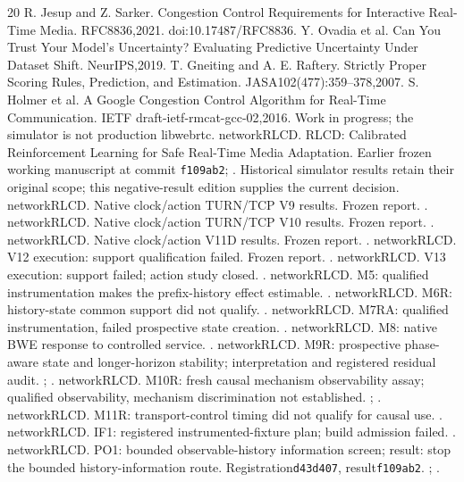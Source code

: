 \begin{thebibliography}{20}
 R. Jesup and Z. Sarker. Congestion Control Requirements for
Interactive Real-Time Media. RFC8836,2021. doi:10.17487/RFC8836.
 Y. Ovadia et al. Can You Trust Your Model's Uncertainty?
Evaluating Predictive Uncertainty Under Dataset Shift. NeurIPS,2019.
 T. Gneiting and A. E. Raftery. Strictly Proper Scoring Rules,
Prediction, and Estimation. JASA102(477):359--378,2007.
 S. Holmer et al. A Google Congestion Control Algorithm for
Real-Time Communication. IETF draft-ietf-rmcat-gcc-02,2016. Work in progress;
the simulator is not production libwebrtc.
 networkRLCD. RLCD: Calibrated Reinforcement Learning for Safe
Real-Time Media Adaptation. Earlier frozen working manuscript at commit
\texttt{f109ab2}; . Historical simulator results retain their
original scope; this negative-result edition supplies the current decision.
 networkRLCD. Native clock/action TURN/TCP V9 results. Frozen report.
.
 networkRLCD. Native clock/action TURN/TCP V10 results. Frozen report.
.
 networkRLCD. Native clock/action V11D results. Frozen report.
.
 networkRLCD. V12 execution: support qualification failed. Frozen report.
.
 networkRLCD. V13 execution: support failed; action study closed.
.
 networkRLCD. M5: qualified instrumentation makes the prefix-history
effect estimable. .
 networkRLCD. M6R: history-state common support did not qualify.
.
 networkRLCD. M7RA: qualified instrumentation, failed prospective
state creation. .
 networkRLCD. M8: native BWE response to controlled service.
.
 networkRLCD. M9R: prospective phase-aware state and longer-horizon
stability; interpretation and registered residual audit.
;
.
 networkRLCD. M10R: fresh causal mechanism observability assay;
qualified observability, mechanism discrimination not established.
;
.
 networkRLCD. M11R: transport-control timing did not qualify for
causal use. .
 networkRLCD. IF1: registered instrumented-fixture plan; build
admission failed. .
 networkRLCD. PO1: bounded observable-history information screen;
result: stop the bounded history-information route. Registration\texttt{d43d407},
result\texttt{f109ab2}.
;
.
\end{thebibliography}
